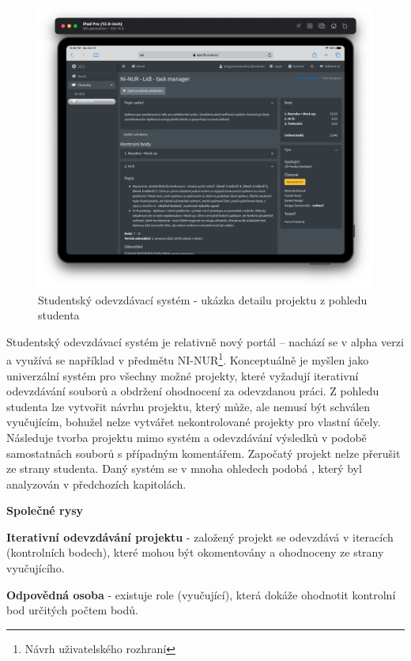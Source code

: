 \begin{figure}[htbp]
   \centering
   \includegraphics[max width=\textwidth]{assets/analysis-sos-portal}
   \caption[Studentský odevzdávací systém - ukázka detailu projektu]{Studentský odevzdávací systém - ukázka detailu projektu z pohledu studenta}\label{pic:sos-portal}
\end{figure}


Studentský odevzdávací systém je relativně nový portál -- nachází se v alpha verzi a využívá se například v předmětu NI-NUR\footnote{Návrh uživatelského rozhraní}.
Konceptuálně je myšlen jako univerzální systém pro všechny možné projekty, které vyžadují iterativní odevzdávání souborů a obdržení ohodnocení za odevzdanou práci.
Z pohledu studenta lze vytvořit návrhu projektu, který může, ale nemusí být schválen vyučujícím, bohužel nelze vytvářet nekontrolované projekty pro vlastní účely.
Následuje tvorba projektu mimo systém a odevzdávání výsledků v podobě samostatnách souborů s případným komentářem.
Započatý projekt nelze přerušit ze strany studenta.
Daný systém se v mnoha ohledech podobá , který byl analyzován v předchozích kapitolách.

\textbf{Společné rysy}

\begin{ul}
   \item
   \textbf{Iterativní odevzdávání projektu} - založený projekt se odevzdává v iteracích (kontrolních bodech), které mohou být okomentovány a ohodnoceny ze strany vyučujícího.
   \item
   \textbf{Odpovědná osoba} - existuje role (vyučující), která dokáže ohodnotit kontrolní bod určitých počtem bodů.
\end{ul}


